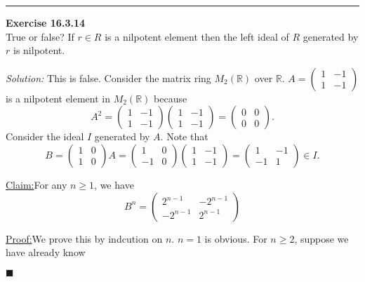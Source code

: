 \documentclass[a4paper, 12pt]{article}
\newenvironment{problem}[2][Exercise]
    { \begin{mdframed}[backgroundcolor=gray!20] \textbf{#1 #2} \\}
    {  \end{mdframed}}
\newenvironment{solution}
    {\textit{Solution:}}
    {}
\newenvironment{claim}[1]{\par\noindent\underline{Claim:}\space#1}{}
\newenvironment{claimproof}[1]{\par\noindent\underline{Proof:}\space#1}{\hfill $\blacksquare$}
\begin{document}
\noindent\rule{7in}{2.8pt}
\begin{problem}{16.3.14}
True or false? If \(r\in R\) is a nilpotent element then the left ideal of \(R\) generated by \(r\) is nilpotent.
\end{problem}
\begin{solution}
This is false. Consider the matrix ring \(M_2(\mathbb{R})\) over \(\mathbb{R}\). \(A=\begin{pmatrix}
    1&-1\\ 
    1&-1
\end{pmatrix}\) is a nilpotent element in \(M_2(\mathbb{R})\) because 
\[A^2=\begin{pmatrix}
    1&-1\\ 
    1&-1
\end{pmatrix}\begin{pmatrix}
    1&-1\\ 
    1&-1
\end{pmatrix}=\begin{pmatrix}
    0&0\\ 
    0&0
\end{pmatrix}.\]
Consider the ideal \(I\) generated by \(A\). Note that 
\[B=\begin{pmatrix}
    1&0\\ 
    1&0
\end{pmatrix}A=\begin{pmatrix}
    1&0\\ 
    -1&0
\end{pmatrix}\begin{pmatrix}
    1&-1\\ 
    1&-1
\end{pmatrix}=\begin{pmatrix}
    1&-1\\ 
    -1&1
\end{pmatrix}\in I.\]
\begin{claim}
For any \(n\geq 1\), we have 
\[B^n=\begin{pmatrix}
    2^{n-1}&-2^{n-1}\\ 
    -2^{n-1}&2^{n-1}
\end{pmatrix}\]
\end{claim}
\begin{claimproof}
We prove this by indcution on \(n\). \(n=1\) is obvious. For \(n\geq 2\), suppose we have already know 

\end{claimproof}
\end{solution}
\end{document}
